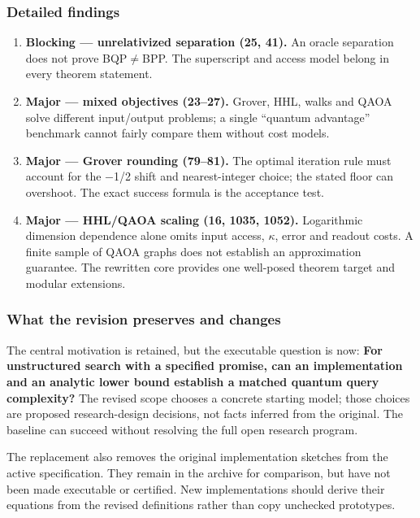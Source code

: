\documentclass[
  11pt,
]{article}
\begin{document}
\subsubsection{Detailed findings}

\begin{enumerate}
\def\labelenumi{\arabic{enumi}.}
\item
  \textbf{Blocking --- unrelativized separation (25, 41).} An oracle
  separation does not prove BQP\ensuremath{\ne}BPP. The superscript and
  access model belong in every theorem statement.
\item
  \textbf{Major --- mixed objectives (23--27).} Grover, HHL, walks and
  QAOA solve different input/output problems; a single ``quantum
  advantage'' benchmark cannot fairly compare them without cost models.
\item
  \textbf{Major --- Grover rounding (79--81).} The optimal iteration
  rule must account for the \ensuremath{-}1/2 shift and nearest-integer
  choice; the stated floor can overshoot. The exact success formula is
  the acceptance test.
\item
  \textbf{Major --- HHL/QAOA scaling (16, 1035, 1052).} Logarithmic
  dimension dependence alone omits input access, \ensuremath{\kappa},
  error and readout costs. A finite sample of QAOA graphs does not
  establish an approximation guarantee. The rewritten core provides one
  well-posed theorem target and modular extensions.
\end{enumerate}

\subsubsection{What the revision preserves and changes}

The central motivation is retained, but the executable question is now:
\textbf{For unstructured search with a specified promise, can an
implementation and an analytic lower bound establish a matched quantum
query complexity?} The revised scope chooses a concrete starting model;
those choices are proposed research-design decisions, not facts inferred
from the original. The baseline can succeed without resolving the full
open research program.

The replacement also removes the original implementation sketches from
the active specification. They remain in the archive for comparison, but
have not been made executable or certified. New implementations should
derive their equations from the revised definitions rather than copy
unchecked prototypes.
\end{document}
